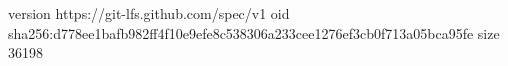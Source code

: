 version https://git-lfs.github.com/spec/v1
oid sha256:d778ee1bafb982ff4f10e9efe8c538306a233cee1276ef3cb0f713a05bca95fe
size 36198
